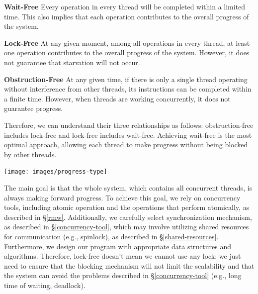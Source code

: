 \documentclass[fontsize=10pt, oneside]{scrartcl}
\newcommand{\secref}[1]{\hyperref[#1]{\textsc{\S}\ref*{#1}}}
\begin{document}
\textbf{Wait-Free} Every operation in every thread will be completed within a limited time. 
This also implies that each operation contributes to the overall progress of the system.

\textbf{Lock-Free} At any given moment, among all operations in every thread, 
at least one operation contributes to the overall progress of the system. 
However, it does not guarantee that starvation will not occur.

\textbf{Obstruction-Free} At any given time, if there is only a single thread operating without interference from other threads, 
its instructions can be completed within a finite time. However, when threads are working concurrently, 
it does not guarantee progress.

Therefore, we can understand their three relationships as follows:
obstruction-free includes lock-free and lock-free includes wait-free.
Achieving wait-free is the most optimal approach, 
allowing each thread to make progress without being blocked by other threads.

\texttt{[image: images/progress-type]}
\label{fig:progress-type}

The main goal is that the whole system, 
which contains all concurrent threads, 
is always making forward progress. 
To achieve this goal, we rely on concurrency tools, 
including atomic operation and the operations that perform atomically, as described in \secref{rmw}. 
Additionally, we carefully select synchronization mechanism, as described in \secref{concurrency-tool}, 
which may involve utilizing shared resources for communication (e.g., spinlock), as described in \secref{shared-resources}. 
Furthermore, we design our program with appropriate data structures and algorithms. 
Therefore, lock-free doesn't mean we cannot use any lock; 
we just need to ensure that the blocking mechanism will not limit the scalability and that the system can avoid the problems described in \secref{concurrency-tool} (e.g., long time of waiting, deadlock).
\end{document}
